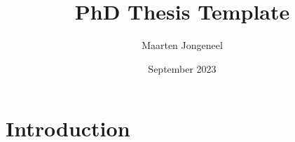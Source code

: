 \documentclass{article}
\title{PhD Thesis Template}
\author{Maarten Jongeneel}
\date{September 2023}
\begin{document}
\maketitle

\section{Introduction}
\end{document}
